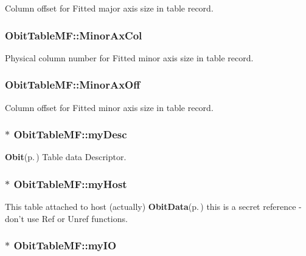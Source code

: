 Column offset for Fitted major axis size in table record. 

\subsubsection{ {\bf Obit\-Table\-MF::Minor\-Ax\-Col}}\label{structObitTableMF_o33}


Physical column number for Fitted minor axis size in table record. 

\subsubsection{ {\bf Obit\-Table\-MF::Minor\-Ax\-Off}}\label{structObitTableMF_o32}


Column offset for Fitted minor axis size in table record. 

\subsubsection{$\ast$ {\bf Obit\-Table\-MF::my\-Desc}}\label{structObitTableMF_o8}


{\bf Obit}{\rm (p.\,\pageref{structObit})} Table data Descriptor. 

\subsubsection{$\ast$ {\bf Obit\-Table\-MF::my\-Host}}\label{structObitTableMF_o14}


This table attached to host (actually) {\bf Obit\-Data}{\rm (p.\,\pageref{structObitData})} this is a secret reference - don't use Ref or Unref functions. 

\subsubsection{$\ast$ {\bf Obit\-Table\-MF::my\-IO}}\label{structObitTableMF_o7}



